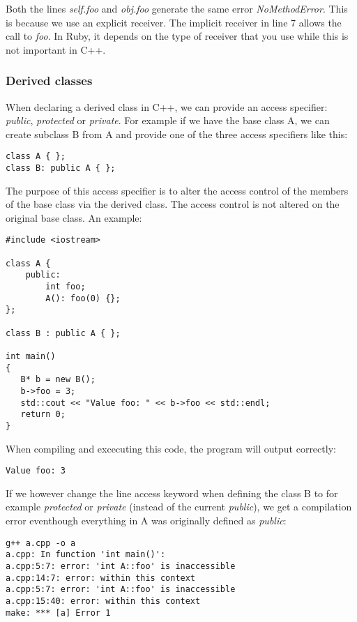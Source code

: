 \documentclass[10pt,a4paper,twocolumn]{article}
\begin{document}
Both the lines \textit{self.foo} and \textit{obj.foo} generate the same error \textit{NoMethodError}. This is because we use an explicit receiver. The implicit receiver in line 7 allows the call to \textit{foo}. In Ruby, it depends on the type of receiver that you use while this is not important in C++.

\subsubsection{Derived classes}
When declaring a derived class in C++, we can provide an access specifier: \textit{public}, \textit{protected} or \textit{private}. For example if we have the base class A, we can create subclass B from A and provide one of the three access specifiers like this:

\begin{lstlisting}
class A { };
class B: public A { };
\end{lstlisting}

The purpose of this access specifier is to alter the access control of the members of the base class via the derived class. The access control is not altered on the original base class. An example:

\begin{lstlisting}
#include <iostream>

class A {
	public:
		int foo;
		A(): foo(0) {};
};

class B : public A { };
 
int main()
{
   B* b = new B();
   b->foo = 3;
   std::cout << "Value foo: " << b->foo << std::endl;
   return 0;
}
\end{lstlisting}

When compiling and excecuting this code, the program will output correctly:
\begin{lstlisting}
Value foo: 3
\end{lstlisting}

If we however change the line access keyword when defining the class B to for example \textit{protected} or \textit{private} (instead of the current \textit{public}), we get a compilation error eventhough everything in A was originally defined as \textit{public}: 

\begin{lstlisting}
g++ a.cpp -o a
a.cpp: In function 'int main()':
a.cpp:5:7: error: 'int A::foo' is inaccessible
a.cpp:14:7: error: within this context
a.cpp:5:7: error: 'int A::foo' is inaccessible
a.cpp:15:40: error: within this context
make: *** [a] Error 1
\end{lstlisting}
\end{document}
